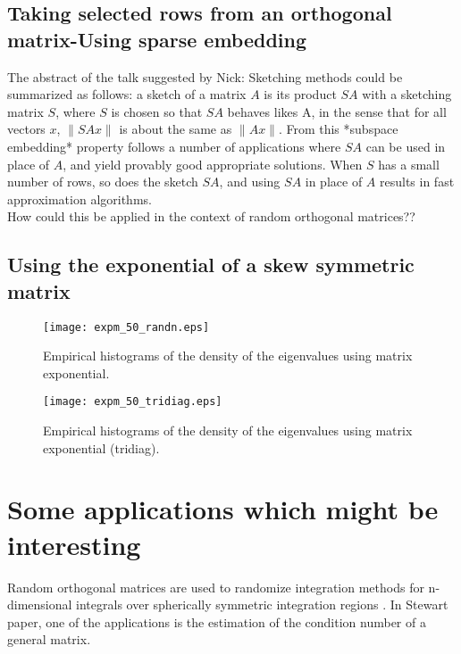 \documentclass[a4paper]{article}
\newcommand\norm[1]{\lVert#1\rVert}
\begin{document}
\subsection{Taking selected rows from an orthogonal matrix-Using sparse embedding}
The abstract of the talk suggested by Nick: Sketching methods could be summarized as follows: a sketch of a 
matrix $A$ is its product $SA$ with a sketching matrix $S$, where $S$ is chosen so that $SA$ behaves likes A, 
in the sense that for all vectors $x$, $\norm{SAx}$ is about the same as $\norm{Ax}$. From this *subspace 
embedding* property follows a number of applications where $SA$ can be used in place of $A$, and yield provably 
good appropriate solutions. When $S$ has a small number of rows, so does the sketch $SA$, and using $SA$ in 
place of $A$ results in fast approximation algorithms.\\

How could this be applied in the context of random orthogonal matrices??

\subsection{Using the exponential of a skew symmetric matrix}

\begin{figure}[!htb]
\centering
\texttt{[image: expm\_50\_randn.eps]}
\caption{Empirical histograms of the density of the eigenvalues using matrix exponential.}
\label{fig:expm1}
\end{figure}

\begin{figure}[!htb]
\centering
\texttt{[image: expm\_50\_tridiag.eps]}
\caption{Empirical histograms of the density of the eigenvalues using matrix exponential (tridiag).}
\label{fig:expm2}
\end{figure}

\section{Some applications which might be interesting}
Random orthogonal matrices are used to randomize integration methods for n-dimensional 
integrals over spherically symmetric integration regions \cite{Genz_methodsfor}.
In Stewart paper, one of the applications is the estimation of the condition number of a general matrix.  
\end{document}
